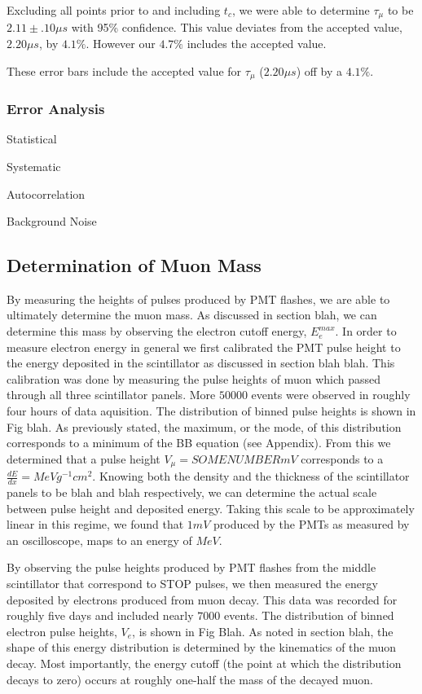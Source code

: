 Excluding all points prior to and including $t_{c}$, we were able to determine $\tau_{\mu}$ to be $2.11 \pm .10 \mu s$ with 95\% confidence.  This value deviates from the accepted value, $2.20\mu s$, by $4.1\%$.  However our $4.7\%$ includes the accepted value.

These error bars include the accepted value for $\tau_{\mu}$ ($2.20\mu s$) off by a $4.1\%$.

\subsubsection{Error Analysis}

Statistical

Systematic

Autocorrelation

Background Noise

\subsection{Determination of Muon Mass}

By measuring the heights of pulses produced by PMT flashes, we are able to ultimately determine the muon mass.  As discussed in section blah, we can determine this mass by observing the electron cutoff energy, $E_{e}^{max}$. In order to measure electron energy in general we first calibrated the PMT pulse height to the energy deposited in the scintillator as discussed in section blah blah. This calibration was done by measuring the pulse heights of muon which passed through all three scintillator panels.  More $50000$ events were observed in roughly four hours of data aquisition.  The distribution of binned pulse heights is shown in Fig blah.  As previously stated, the maximum, or the mode, of this distribution corresponds to a minimum of the BB equation (see Appendix).  From this we determined that a pulse height $V_{\mu} = SOME NUMBER mV$ corresponds to a $\frac{dE}{dx}= MeV g^{-1} cm^{2}$.  Knowing both the density and the thickness of the scintillator panels to be blah and blah respectively, we can determine the actual scale between pulse height and deposited energy.  Taking this scale to be approximately linear in this regime, we found that $1mV$ produced by the PMTs as measured by an oscilloscope, maps to an energy of $MeV$. 

By observing the pulse heights produced by PMT flashes from the middle scintillator that correspond to STOP pulses, we then measured the energy deposited by electrons produced from muon decay.  This data was recorded for roughly five days and included nearly $7000$ events.  The distribution of binned electron pulse heights, $V_{e}$, is shown in Fig Blah.  As noted in section blah, the shape of this energy distribution is determined by the kinematics of the muon decay.  Most importantly, the energy cutoff (the point at which the distribution decays to zero) occurs at roughly one-half the mass of the decayed muon.

